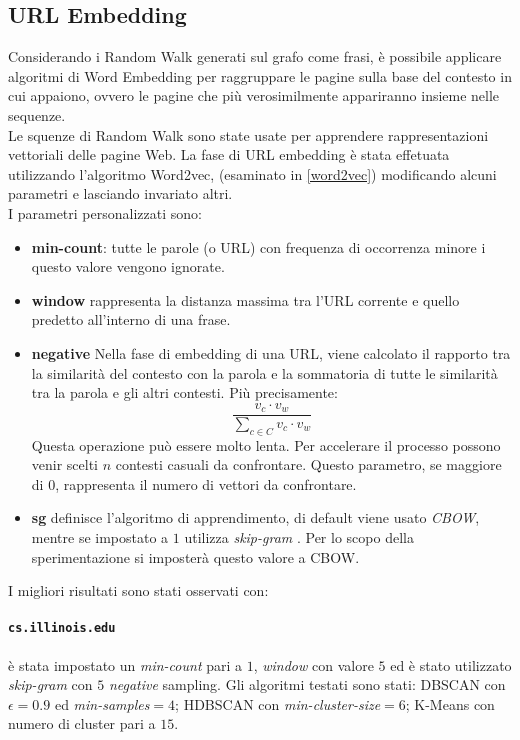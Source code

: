 \subsection{URL Embedding}
Considerando i Random Walk generati sul grafo come frasi, è possibile applicare algoritmi di Word Embedding per raggruppare le pagine sulla base del contesto in cui appaiono, ovvero le pagine che più verosimilmente appariranno insieme nelle sequenze.
\\
Le squenze di Random Walk sono state usate per apprendere rappresentazioni vettoriali delle pagine Web. La fase di URL embedding è stata effetuata utilizzando l'algoritmo Word2vec, \cite{gensim} (esaminato in \ref{word2vec}) modificando alcuni parametri e lasciando invariato altri.
\\
I parametri personalizzati sono:
\begin{itemize}
\item \textbf{min-count}: tutte le parole (o URL) con frequenza di occorrenza minore i questo valore vengono ignorate.
\item \textbf{window} rappresenta la distanza massima tra l'URL corrente e quello predetto all'interno di una frase.
\item \textbf{negative} Nella fase di embedding di una URL, viene calcolato il rapporto tra la similarità del contesto con la parola e la sommatoria di tutte le similarità tra la parola e gli altri contesti. Più precisamente:
\begin{equation}
\frac{v_c \cdot v_w}{\sum\limits_{c \in C} v_c \cdot v_w}
\end{equation}
Questa operazione può essere molto lenta. Per accelerare il processo possono venir scelti $n$ contesti casuali da confrontare. Questo parametro, se maggiore di $0$, rappresenta il numero di vettori da confrontare.
\item \textbf{sg} definisce l'algoritmo di apprendimento, di default viene usato \textit{CBOW}, mentre se impostato a $1$ utilizza \textit{skip-gram} \cite{Mikolov13}. Per lo scopo della sperimentazione si imposterà questo valore a  CBOW.
\end{itemize}
I migliori risultati sono stati osservati con:

\paragraph{\texttt{cs.illinois.edu}} è stata impostato un \textit{min-count} pari a $1$, \textit{window} con valore $5$ ed è stato utilizzato \textit{skip-gram} con $5$ \textit{negative} sampling. Gli algoritmi testati sono stati: DBSCAN con $\epsilon = 0.9$ ed \textit{min-samples}$ = 4$; HDBSCAN con \textit{min-cluster-size}$=6$; K-Means con numero di cluster pari a $15$. 

